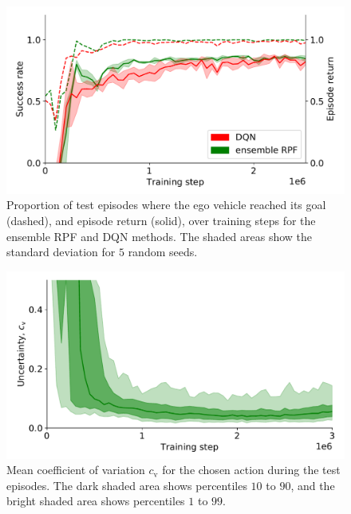 \begin{figure}[!t]
	\centering
		\includegraphics[width=0.99\columnwidth]{figures/return_success_rate_2_wo_type_3_fonts.pdf}
	\caption{Proportion of test episodes where the ego vehicle reached its goal (dashed), and episode return (solid), over training steps for the ensemble RPF and DQN methods. The shaded areas show the standard deviation for $5$ random seeds.}
	\label{fig:returnAndSuccess}
\end{figure}


\begin{figure}[!t]
	\centering
		\includegraphics[width=0.99\columnwidth]{figures/uncertainty_3_wo_type_3_fonts.pdf}
		\caption{Mean coefficient of variation $c_\mathrm{v}$ for the chosen action during the test episodes. The dark shaded area shows percentiles $10$ to $90$, and the bright shaded area shows percentiles $1$ to $99$.}
	\label{fig:cv}
\end{figure}



